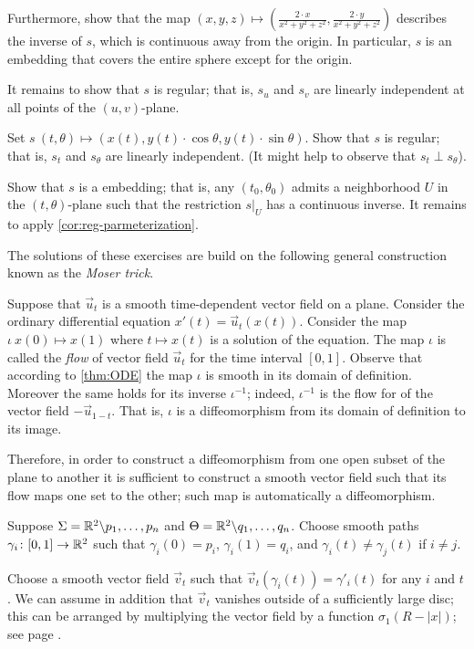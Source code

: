 Furthermore, show that the map $(x,y,z)\mapsto (\tfrac{2\cdot x}{x^2+y^2+z^2},\tfrac{2\cdot y}{x^2+y^2+z^2})$
describes the inverse of $s$, which is continuous away from the origin.
In particular, $s$ is an embedding that covers the entire sphere except for the origin.

It remains to show that $s$ is regular; that is, $s_u$ and $s_v$ are linearly independent at all points of the $(u,v)$-plane.

Set
$s\:(t,\theta)\mapsto (x(t), y(t)\cdot\cos\theta,y(t)\cdot\sin\theta)$.
Show that $s$ is regular; that is, $s_t$ and $s_\theta$ are linearly independent.
(It might help to observe that $s_t\perp s_\theta$).

Show that $s$ is a embedding; that is, any $(t_0,\theta_0)$ admits a neighborhood $U$ in the $(t,\theta)$-plane such that the restriction $s|_U$ has a continuous inverse.
It remains to apply \ref{cor:reg-parmeterization}.

The solutions of these exercises are build on the following general construction known as the \emph{Moser trick}.

Suppose that $\vec u_t$ is a smooth time-dependent vector field on a plane.
Consider the ordinary differential equation $x'(t)=\vec u_t(x(t))$.
Consider the map $\iota\:x(0)\mapsto x(1)$ where $t\mapsto x(t)$ is a solution of the equation.
The map $\iota$ is called the \emph{flow} of vector field $\vec u_t$ for the time interval $[0,1]$.
Observe that according to \ref{thm:ODE} the map $\iota$ is smooth in its domain of definition.
Moreover the same holds for its inverse $\iota^{-1}$;
indeed, $\iota^{-1}$ is the flow for of the vector field $-\vec u_{1-t}$.
That is, $\iota$ is a diffeomorphism from its domain of definition to its image. 


Therefore, in order to construct a diffeomorphism from one open subset of the plane to another it is sufficient to construct a smooth vector field such that its flow maps one set to the other;
such map is automatically a diffeomorphism.


Suppose $\Sigma=\mathbb{R}^2\backslash{p_1,\dots,p_n}$ and $\Theta=\mathbb{R}^2\backslash{q_1,\dots,q_n}$.
Choose smooth paths $\gamma_i\:[0,1]\z\to \RR^2$ such that $\gamma_i(0)=p_i$,
$\gamma_i(1)=q_i$, and $\gamma_i(t)\ne \gamma_j(t)$ if $i\ne j$.

Choose a smooth vector field $\vec v_t$ such that $\vec v_t(\gamma_i(t))=\gamma'_i(t)$ for any $i$ and $t$.
We can assume in addition that $\vec v_t$ vanishes outside of a sufficiently large disc; this can be arranged by  multiplying the vector field by a function 
$\sigma_1(R-|x|)$; see page \pageref{page:sigma-function}.

